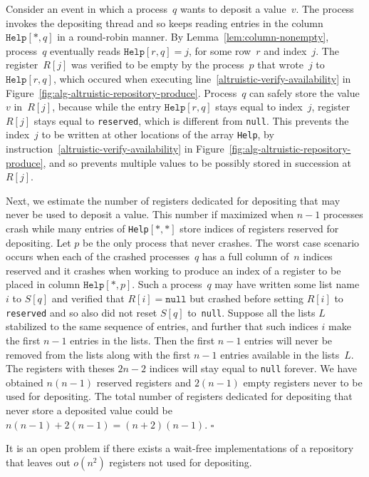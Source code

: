 \documentclass[11pt]{article}
\newcommand{\qed}{\hfill $\square$ \smallbreak}
\newenvironment{proof}{\noindent{\bf Proof:}}{\qed}
\begin{document}
\begin{proof}
Consider an event in which a process~$q$ wants to deposit a value~$v$.
The process invokes the depositing thread and so keeps reading entries in the column $\texttt{Help}[*,q]$ in a round-robin manner.
By Lemma~\ref{lem:column-nonempty}, process~$q$ eventually reads $\texttt{Help}[r,q]=j$,  for some row~$r$ and index~$j$. 
The register~$R[j]$ was verified to be empty by the process~$p$ that wrote~$j$ to $\texttt{Help}[r,q]$, which occured when executing line~\eqref{altruistic-verify-availability} in Figure~\ref{fig:alg-altruistic-repository-produce}.
Process~$q$ can safely store the value~$v$ in~$R[j]$, because while the entry $\texttt{Help}[r,q]$ stays equal to index~$j$, register~$R[j]$ stays equal to \texttt{reserved}, which is different from \texttt{null}.
This prevents the index~$j$ to be written at other locations of the array \texttt{Help}, by instruction~\eqref{altruistic-verify-availability} in Figure~\ref{fig:alg-altruistic-repository-produce}, and so prevents multiple values to be possibly stored in succession at~$R[j]$.

Next, we estimate the number of registers dedicated for depositing that may never be used to deposit a value.
This number if maximized when $n-1$ processes crash while many entries of  \texttt{Help}$[*,*]$ store indices of  registers reserved for depositing.
Let $p$ be the only process that never crashes.
The worst case scenario occurs when each of the crashed processes~$q$ has a full column of~$n$ indices reserved and it crashes when working to produce an index of a register to be placed in column $\texttt{Help}[*,p]$.
Such a process~$q$ may have written some list name~$i$ to $S[q]$ and verified that $R[i]=\texttt{null}$ but crashed before setting $R[i]$ to \texttt{reserved} and so also did not reset $S[q]$ to~\texttt{null}.
Suppose all the lists $L$ stabilized to the same sequence of entries, and further that such indices $i$ make the first $n-1$ entries in the lists. 
Then the first $n-1$ entries will never be removed from the lists along with the first $n-1$ entries available in the lists~$L$.
The registers with theses $2n-2$ indices will stay equal to \texttt{null} forever.
We have obtained $n(n-1)$ reserved registers and $2(n-1)$  empty registers never to be used for depositing.
The total number of registers dedicated for depositing that never store a deposited value could be $n(n-1) + 2(n-1) = (n+2)(n-1)$.
\end{proof}

It is an open problem if there exists a wait-free implementations of a repository that leaves out $o(n^2)$ registers not used for depositing.
\end{document}
